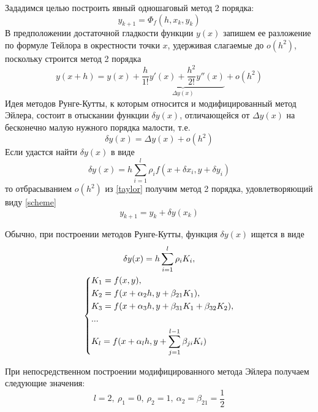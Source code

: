 \documentclass[a4paper, 12pt]{article}
\begin{document}
	Зададимся целью построить явный одношаговый метод 2 порядка:
	\begin{equation} \label{scheme}
		y_{k+1}=\Phi_f(h,x_{k},y_{k})
	\end{equation}
	В предположении достаточной гладкости функции $y(x)$ запишем ее разложение по формуле Тейлора в окрестности точки $x$, удерживая слагаемые до $o(h^2)$, поскольку строится метод 2 порядка
	\begin{equation} \label{taylor}
		y(x+h)=y(x)+\underbrace{\dfrac{h}{1!}y'(x)+\dfrac{h^2}{2!}y''(x)}_{\Delta y(x)}+o(h^2)
	\end{equation} 
	Идея методов Рунге-Кутты, к которым относится и модифицированный метод Эйлера, состоит в отыскании функции $\delta y(x)$, отличающейся от $\Delta y(x)$ на бесконечно малую нужного порядка малости, т.е.
	\begin{equation}
		\delta y(x) = \Delta y(x) + o(h^2)
	\end{equation}
	Если удастся найти $\delta y(x)$ в виде
	\begin{equation}
		\delta y(x) = h\sum\limits_{i=1}^l \rho_if(x+\delta x_i, y + \delta y_i)
	\end{equation}
	то отбрасыванием $o(h^2)$ из \eqref{taylor} получим метод 2 порядка, удовлетворяющий виду \eqref{scheme}
	\begin{equation}
		y_{k+1} = y_{k} + \delta y(x_{k})
	\end{equation}
	
	Обычно, при построении методов Рунге-Кутты, функция $\delta y(x)$ ищется в виде
	\begin{equation}
		\begin{gathered}
			\delta y(x) = h\sum\limits_{i=1}^l\rho_iK_i,\\
			\begin{dcases}
				K_1 = f(x,y),\\
				K_2 = f(x + \alpha_2h, y + \beta_{21}K_1),\\
				K_3 = f(x + \alpha_3h, y + \beta_{31}K_1 + \beta_{32}K_2),\\
				...\\
				K_l = f(x + \alpha_lh, y + \sum\limits_{j=1}^{l-1}\beta_{ji}K_i)
			\end{dcases}
		\end{gathered}		
	\end{equation}

	При непосредственном построении модифицированного метода Эйлера получаем следующие значения:
	\begin{equation}
		l=2,\ \rho_1=0,\ \rho_2=1,\ \alpha_2=\beta_{21}=\dfrac{1}{2}
	\end{equation}
\end{document}
